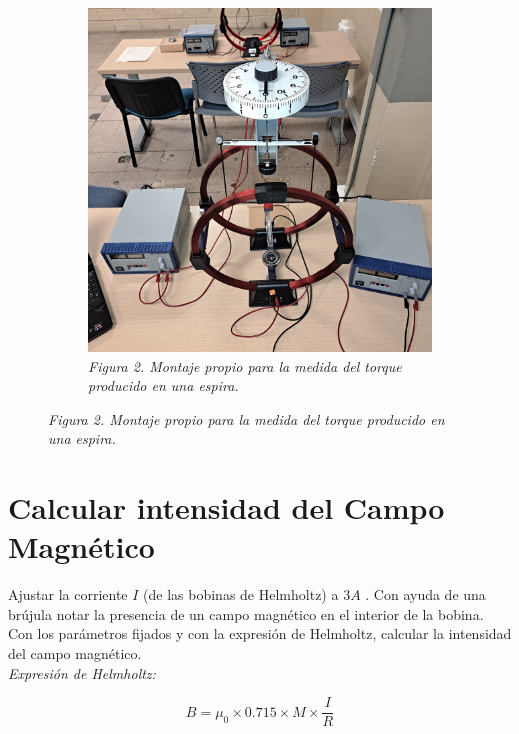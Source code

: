 \begin{figure}[H]
    \centering
    \begin{subfigure}[b]{0.45\textwidth}
        \centering
        \includegraphics[width=\textwidth]{Figures/0. General/1.2.jpg}
        \caption{\textit{Figura 2. Montaje propio para la medida del torque producido en una espira.}}
        \label{Figura 2}
    \end{subfigure}
\end{figure}

\section{Calcular intensidad del Campo Magnético}

Ajustar la corriente $I$ (de las bobinas de Helmholtz) a $3A$ . Con ayuda de una
brújula notar la presencia de un campo magnético en el interior de la bobina.
Con los parámetros fijados y con la expresión de Helmholtz, calcular la
intensidad del campo magnético.
\\
\textit{Expresión de Helmholtz:}

\[B = \mu_0 \times 0.715 \times M \times \frac{I}{R} \]


